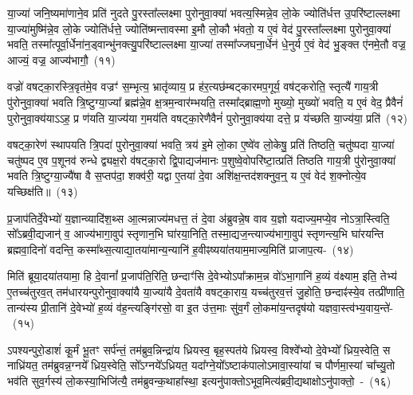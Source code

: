 या॒ज्या॑ जनि॒ष्यमा॑णाने॒व प्रति॑ नुदते पु॒रस्ता᳚ल्लक्ष्मा पुरोनुवा॒क्या॑ भवत्य॒स्मिन्ने॒व लो॒के ज्योति॑र्धत्त उ॒परि॑ष्टाल्लक्ष्मा या॒ज्या॑मुष्मि॑न्ने॒व लो॒के ज्योति॑र्धत्ते॒ ज्योति॑ष्मन्तावस्मा इ॒मौ लो॒कौ भ॑वतो॒ य ए॒वं वेद॑ पु॒रस्ता᳚ल्लक्ष्मा पुरोनुवा॒क्या॑ भवति॒ तस्मा᳚त्पूर्वा॒र्धेना॑न॒ड्वान्भु॑नक्त्यु॒परि॑ष्टाल्लक्ष्मा या॒ज्या॑ तस्मा᳚ज्जघना॒र्धेन॑ धे॒नुर्य ए॒वं वेद॑ भु॒ङ्क्त ए॑नमे॒तौ वज्र॒ आज्यं॒ वज्र॒ आज्य॑भागौ॒~(११)\ip

वज्रो॑ वषट्का॒रस्त्रि॒वृत॑मे॒व वज्रꣳ॑ स॒म्भृत्य॒ भ्रातृ॑व्याय॒ प्र ह॑र॒त्यछ॑म्बट्कारमप॒गूर्य॒ वष॑ट्करोति॒ स्तृत्यै॑ गाय॒त्री पु॑रोनुवा॒क्या॑ भवति त्रि॒ष्टुग्या॒ज्या᳚ ब्रह्म॑न्ने॒व क्ष॒त्रम॒न्वार॑म्भयति॒ तस्मा᳚द्ब्राह्म॒णो मुख्यो॒ मुख्यो॑ भवति॒ य ए॒वं वेद॒ प्रैवैनं॑ पुरोनुवा॒क्य॑या\-ऽऽ\-ह॒ प्र ण॑यति या॒ज्य॑या ग॒मय॑ति वषट्का॒रेणैवैनं॑ पुरोनुवा॒क्य॑या दत्ते॒ प्र य॑च्छति या॒ज्य॑या॒ प्रति॑~(१२)\ip

वषट्का॒रेण॑ स्थापयति त्रि॒पदा॑ पुरोनुवा॒क्या॑ भवति॒ त्रय॑ इ॒मे लो॒का ए॒ष्वे॑व लो॒केषु॒ प्रति॑ तिष्ठति॒ चतु॑ष्पदा या॒ज्या॑ चतु॑ष्पद ए॒व प॒शूनव॑ रुन्धे द्व्यक्ष॒रो व॑षट्का॒रो द्वि॒पाद्यज॑मानः प॒शुष्वे॒वोपरि॑ष्टा॒त्प्रति॑ तिष्ठति गाय॒त्री पु॑रोनुवा॒क्या॑ भवति त्रि॒ष्टुग्या॒ज्यै॑षा वै स॒प्तप॑दा॒ शक्व॑री॒ यद्वा ए॒तया॑ दे॒वा अशि॑क्ष॒न्तद॑शक्नुव॒न्॒ य ए॒वं वेद॑ श॒क्नोत्ये॒व यच्छिक्ष॑ति॥~(१३)\ip

{\anuvakamend[{दे॒वता॑नाङ्करोत्यु॒परि॑ष्टाल्ल॒क्ष्मा\-ऽऽ\-ज्य॑भागौ॒ प्रति॑ श॒क्नोत्ये॒व द्वे च॑}]}

प्र॒जा\-प॑तिर्दे॒वेभ्यो॑ य॒ज्ञान्व्यादि॑श॒थ्स आ॒त्मन्नाज्य॑\-मधत्त॒ तं दे॒वा अ॑ब्रुवन्ने॒ष वाव य॒ज्ञो यदाज्य॒मप्ये॒व नो\-ऽत्रा॒स्त्विति॒ सो᳚\-ऽब्रवी॒द्यजान्॑ व॒ आज्य॑\-भागा॒वुप॑ स्तृणान॒भि घा॑रया॒निति॒ तस्मा॒द्\-यज॒न्त्याज्य॑\-भागा॒वुप॑ स्तृणन्त्य॒भि घा॑रयन्ति ब्रह्मवा॒दिनो॑ वदन्ति॒ कस्मा᳚थ्स॒त्याद्या॒तया॑\-मान्य॒न्यानि॑ ह॒वीꣴष्यया॑त\-याम॒माज्य॒\-मिति॑ प्राजाप॒त्य-~(१४)\ip

मिति॑ ब्रूया॒दया॑तयामा॒ हि दे॒वानां᳚ प्र॒जा\-प॑ति॒रिति॒ छन्दाꣳ॑सि दे॒वेभ्यो\-ऽपा᳚क्राम॒न्न वो॑\-ऽभा॒गानि॑ ह॒व्यं व॑क्ष्याम॒ इति॒ तेभ्य॑ ए॒तच्च॑तुरव॒त् तम॑धारयन्पुरोनुवा॒क्या॑यै या॒ज्या॑यै दे॒वता॑यै वषट्का॒राय॒ यच्च॑तुरव॒त्तं जु॒होति॒ छन्दाꣴ॑स्ये॒व तत्प्री॑णाति॒ तान्य॑स्य प्री॒तानि॑ दे॒वेभ्यो॑ ह॒व्यं व॑ह॒न्त्यङ्गि॑रसो॒ वा इ॒त उ॑त्त॒माः सु॑व॒र्गं लो॒कमा॑य॒न्तदृष॑यो यज्ञवा॒स्त्व॑भ्य॒वाय॒न्ते॑-~(१५)\ip

ऽपश्यन्पुरो॒डाशं॑ कू॒र्मं भू॒तꣳ सर्प॑न्तं॒ तम॑ब्रुव॒न्निन्द्रा॑य ध्रियस्व॒ बृह॒स्पत॑ये ध्रियस्व॒ विश्वे᳚भ्यो दे॒वेभ्यो᳚ ध्रिय॒स्वेति॒ स नाध्रि॑यत॒ तम॑ब्रुवन्न॒ग्नये᳚ ध्रिय॒स्वेति॒ सो᳚\-ऽग्नये᳚\-ऽध्रियत॒ यदा᳚ग्ने॒यो᳚\-ऽष्टाक॑पालो\-ऽमावा॒स्या॑यां च पौर्णमा॒स्यां चा᳚च्यु॒तो भव॑ति सुव॒र्गस्य॑ लो॒कस्या॒भिजि॑त्यै॒ तम॑ब्रुवन्क॒थाहा᳚स्था॒ इत्यनु॑पाक्तो\-ऽभूव॒मित्य॑ब्रवी॒द्यथाक्षो\-ऽनु॑पाक्तो॒~-~(१६)\ip

